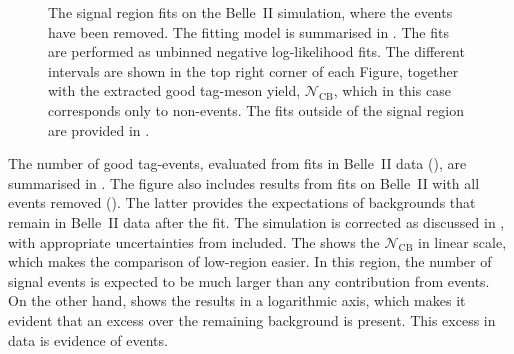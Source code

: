 \begin{figure}[htbp!]
{    }
    \caption{\label{fig:nosignal_fits_signal}
    The \EB signal region fits on the Belle~II simulation, where the \BtoXsdgamma events have been removed.
    The fitting model is summarised in .
    The fits are performed as unbinned negative log-likelihood fits.
    The different \EB intervals are shown in the top right corner of each Figure, 
    together with the extracted good tag-\B meson yield, $\mathcal{N}_{\mathrm{CB}}$, which in this case corresponds only to non-\BtoXsdgamma events.
    The fits outside of the signal region are provided in .
    }
\end{figure}

The number of good tag-\B events, evaluated from fits in Belle~II data (),
are summarised in .
The figure also includes results from fits on Belle~II \MC with all \BtoXsgamma events removed ().
The latter provides the expectations of \BB backgrounds that remain in Belle~II data after the fit.
The simulation is corrected as discussed in , with appropriate uncertainties from  included.
The  shows the $\mathcal{N}_{\mathrm{CB}}$ in linear scale, which makes the comparison of low-\EB region easier. 
In this region, the number of signal events is expected to be much larger than any contribution from \BtoXsgamma events.
On the other hand,  shows the results in a logarithmic axis, which makes it evident that an excess over the remaining \BB background is present.
This excess in data is evidence of \BtoXsdgamma events.

